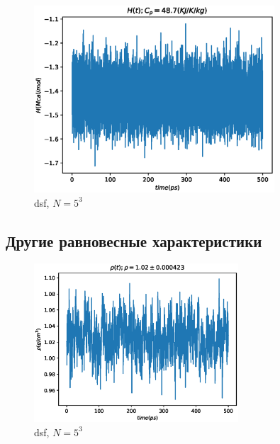 \documentclass[a4paper,12pt]{article} %
\begin{document}
\begin{figure}[h!]
\begin{center}
\includegraphics[width=0.8\textwidth]{./pics/dsf_H_05_N5}
\end{center}
\caption{dsf, $N = 5^3$} \label{img:dsf_H_0.05_N5}
\end{figure}

\subsection{Другие равновесные характеристики}

\begin{figure}[h!]
\begin{center}
\includegraphics[width=0.68\textwidth]{./pics/dsf_N5rho}
\end{center}
\caption{dsf, $N = 5^3$} \label{img:pppm_H_N5}
\end{figure}
\end{document}
